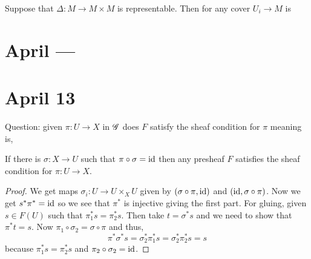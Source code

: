 \documentclass[12pt]{article}
\begin{document}
\begin{rmk}
Suppose that $\Delta : M \to M \times M$ is representable. Then for any cover $U_i \to M$ is 
\end{rmk}

\section{April ---}

\section{April 13}

Question: given $\pi : U \to X$ in $\mathscr{G}$ does $F$ satisfy the sheaf condition for $\pi$ meaning is,
\begin{center}
\end{center}

\begin{theorem}
If there is $\sigma : X \to U$ such that $\pi \circ \sigma = \mathrm{id}$ then any presheaf $F$ satisfies the sheaf condition for $\pi : U \to X$. 
\end{theorem}

\begin{proof}
We get maps $\sigma_i : U \to U \times_X U$ given by $(\sigma \circ \pi, \mathrm{id})$ and $(\mathrm{id}, \sigma \circ \pi)$. Now we get $s^* \pi^* = \mathrm{id}$ so we see that $\pi^*$ is injective giving the first part. For gluing, given $s \in F(U)$ such that $\pi_1^* s = \pi_2^* s$. Then take $t = \sigma^* s$ and we need to show that $\pi^* t = s$.  Now $\pi_1 \circ \sigma_2 = \sigma \circ \pi$ and thus,
\[ \pi^* \sigma^* s = \sigma_2^* \pi_1^* s = \sigma_2^* \pi_2^* s = s \]
because $\pi_1^* s = \pi_2^* s$ and $\pi_2 \circ \sigma_2 = \mathrm{id}$.
\end{proof}
\end{document}
